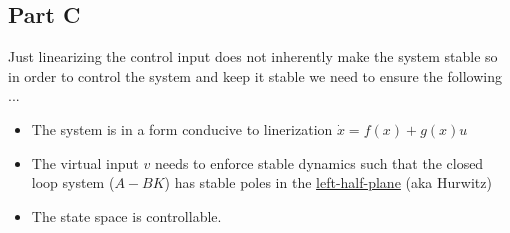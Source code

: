 \subsection*{Part C}

Just linearizing the control input does not inherently make the system stable so in order to control the system and keep it stable we need to ensure the following ...

\begin{itemize}
  \item The system is in a form conducive to linerization $\dot{x} = f(x) + g(x)u$
  \item  The virtual input $v$ needs to enforce stable dynamics such that the closed loop system ($A - BK$) has stable poles in the \underline{left-half-plane} (aka Hurwitz)
  \item  The state space is controllable.
\end{itemize}
